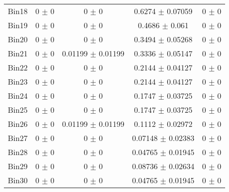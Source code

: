 \begin{tabular}{@{\extracolsep{4pt}}lcccc@{}}
     Bin18 & 0 $\pm$ 0 & 0 $\pm$ 0 & 0.6274 $\pm$ 0.07059 & 0 $\pm$ 0 \\ 
     Bin19 & 0 $\pm$ 0 & 0 $\pm$ 0 & 0.4686 $\pm$ 0.061 & 0 $\pm$ 0 \\ 
     Bin20 & 0 $\pm$ 0 & 0 $\pm$ 0 & 0.3494 $\pm$ 0.05268 & 0 $\pm$ 0 \\ 
     Bin21 & 0 $\pm$ 0 & 0.01199 $\pm$ 0.01199 & 0.3336 $\pm$ 0.05147 & 0 $\pm$ 0 \\ 
     Bin22 & 0 $\pm$ 0 & 0 $\pm$ 0 & 0.2144 $\pm$ 0.04127 & 0 $\pm$ 0 \\ 
     Bin23 & 0 $\pm$ 0 & 0 $\pm$ 0 & 0.2144 $\pm$ 0.04127 & 0 $\pm$ 0 \\ 
     Bin24 & 0 $\pm$ 0 & 0 $\pm$ 0 & 0.1747 $\pm$ 0.03725 & 0 $\pm$ 0 \\ 
     Bin25 & 0 $\pm$ 0 & 0 $\pm$ 0 & 0.1747 $\pm$ 0.03725 & 0 $\pm$ 0 \\ 
     Bin26 & 0 $\pm$ 0 & 0.01199 $\pm$ 0.01199 & 0.1112 $\pm$ 0.02972 & 0 $\pm$ 0 \\ 
     Bin27 & 0 $\pm$ 0 & 0 $\pm$ 0 & 0.07148 $\pm$ 0.02383 & 0 $\pm$ 0 \\ 
     Bin28 & 0 $\pm$ 0 & 0 $\pm$ 0 & 0.04765 $\pm$ 0.01945 & 0 $\pm$ 0 \\ 
     Bin29 & 0 $\pm$ 0 & 0 $\pm$ 0 & 0.08736 $\pm$ 0.02634 & 0 $\pm$ 0 \\ 
     Bin30 & 0 $\pm$ 0 & 0 $\pm$ 0 & 0.04765 $\pm$ 0.01945 & 0 $\pm$ 0 \\ 
\hline\hline
  \end{tabular}

